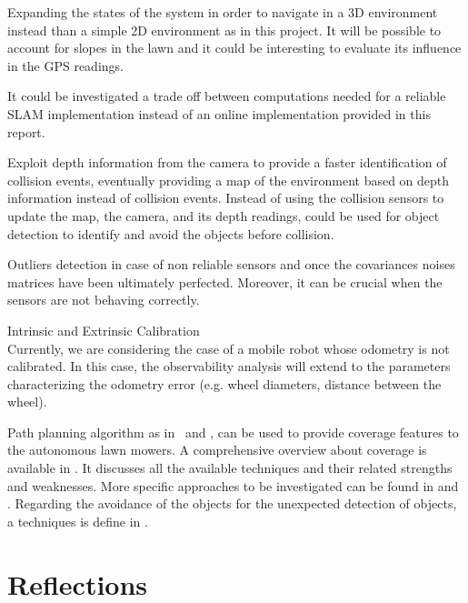 \noindent
Expanding the states of the system in order to navigate in a 3D environment instead than a simple 2D environment as in this project.
It will be possible to account for slopes in the lawn and it could be interesting to evaluate its influence in the GPS readings.


It could be investigated a trade off between computations needed for a reliable SLAM implementation instead of an online implementation provided in this report. 


Exploit depth information from the camera to provide a faster identification of collision events, eventually providing a map of the environment based on depth information instead of collision events.
Instead of using the collision sensors to update the map, the camera, and its depth readings,  could be used for object detection to identify and avoid the objects before collision.


Outliers detection in case of non reliable sensors and once the covariances noises matrices have been ultimately perfected. Moreover, it can be crucial when the sensors are not behaving correctly.


Intrinsic and Extrinsic Calibration\\
Currently, we are considering the case of a mobile
robot whose odometry is not calibrated. In this case,
the observability analysis will extend to the parameters
characterizing the odometry error (e.g. wheel diameters,
distance between the wheel).


Path planning algorithm as in~\cite{coveragePathplanning} and \cite{machines6040046}, can be used to provide coverage features to the autonomous lawn mowers.
A comprehensive overview about coverage is available in \cite{galceran_survey_2013}. It discusses all the available techniques and their related strengths and weaknesses.
More specific approaches to be investigated can be found in \cite{hameed_coverage_2017} and \cite{cabreira_grid-based_2019}.
Regarding the avoidance of the objects for the unexpected detection of objects, a techniques is define in \cite{daltorio_obstacle-edging_2010}.



\section{Reflections}
\label{sec:reflections}


